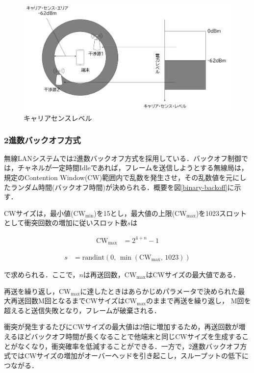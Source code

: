 \documentclass[a4paper,10pt]{ltjsarticle}
\begin{document}
\begin{figure}[H]
  \centering
  \includegraphics[width=\textwidth]{./assets/CS_level.png}
  \caption{キャリアセンスレベル\cite{midori}}
  \label{fig:CS_level}
\end{figure}


\subsubsection{2進数バックオフ方式}

無線LANシステムでは2進数バックオフ方式を採用している．バックオフ制御では，チャネルが一定時間Idleであれば，フレームを送信しようとする無線局は，規定のContention Window(CW)範囲内で乱数を発生させ，その乱数値を元にしたランダム時間(バックオフ時間)が決められる．概要を図\ref{binary-backoff}に示す．


CWサイズは，最小値($\mathrm{CW_{min}}$)を15とし，最大値の上限($\mathrm{CW_{max}}$)を1023スロットとして衝突回数の増加に従いスロット数$s$は


\begin{align}
  \mathrm{CW}_{\max} &= 2^{4 + n} - 1
\end{align}

\begin{align}
  s &= \mathrm{randint}(0, \, \min(\mathrm{CW}_{\max}, \, 1023))
  \label{slot}
\end{align}

で求められる．ここで，$n$は再送回数，$\mathrm{CW}_{\max}$はCWサイズの最大値である．

再送を繰り返し，$\mathrm{CW_{max}}$に達したときはあらかじめパラメータで決められた最大再送回数M回となるまでCWサイズは$\mathrm{CW_{max}}$のままで再送を繰り返し，
M回を超えると送信失敗となり，フレームが破棄される．

衝突が発生するたびにCWサイズの最大値は2倍に増加するため，再送回数が増えるほどバックオフ時間が長くなることで他端末と同じCWサイズを生成することがなくなり，衝突確率を低減することができる．一方で，2進数バックオフ方式ではCWサイズの増加がオーバーヘッドを引き起こし，スループットの低下につながる．
\end{document}
